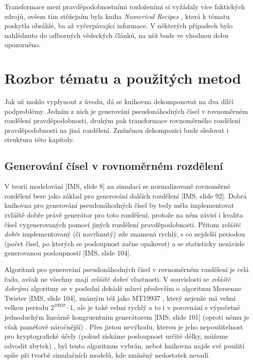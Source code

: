 \documentclass[a4paper,11pt]{article}
\begin{document}
Transformace mezi pravděpodobnostními rozloženími si vyžádaly více faktických zdrojů, ovšem tím stěžejním byla kniha \emph{Numerical Recipes} \cite{NR}, která k tématu poskytla obsáhlé, ba až vyčerpávající informace. V některých případech bylo nahlédnuto do odborných vědeckých článků, na něž bude ve vhodnou dobu upozorněno.


\section{Rozbor tématu a použitých metod}
Jak už mohlo vyplynout z úvodu, dá se knihovna dekomponovat na dva dílčí podproblémy. Jedním z nich je generování pseudonáhodných čísel v rovnoměrném rozdělení pravděpodobnosti, druhým pak transformace rovnoměrného rozdělení pravděpodobnosti na jiná rozdělení. Zmíněnou dekompozici bude sledovat i struktura této kapitoly.

\subsection{Generování čísel v rovnoměrném rozdělení}
V teorii modelování [IMS, slide 8] na simulací se normalizované rovnoměrné rozdělení bere jako základ pro generování dalších rozdělení [IMS, slide 92]. Dobrá knihovna pro generování pseudonáhodných čísel by tedy měla implementovat zvláště dobře právě generátor pro toto rozdělení, protože na něm závisí i kvalita čísel vygenerovaných pomocí jiných rozdělení pravděpodobnosti. Přitom \emph{zvláště dobře} implementovaný (či navrhnutý) zde znamená rychlý, s co nejdelší periodou (počet čísel, po kterých se posloupnost začne opakovat) a se statisticky nezávisle generovanou posloupností [IMS, slide 104].

Algoritmů pro generování pseudonáhodných čísel v rovnoměrném rozdělení je celá řada, avšak ne všechny mají \emph{zvláště dobré} vlastnosti. V souvislosti se \emph{zvláště dobrými} algoritmy se v poslední dekádě mluví především o algoritmu Mersenne Twister [IMS, slide 104], známým též jako MT19937 \cite{Matsumoto}, který nejenže má velmi velkou periodu $2^{19937} – 1$, ale je také velmi rychlý a to i v porovnání s výpočetně jednoduchým lineárně kongruentním generátorem [IMS, slide 101] (oproti němu je však paměťově náročnější) \cite{Matsumoto}. Přes jistou nevýhodu, kterou je jeho nepoužitelnost pro kryptografické účely (pokud získáme posloupnost určité délky, můžeme odvodit zbytek) \cite{Matsumoto}, byl tento algoritmus vybrán, neboť knihovna najde své použití spíše při tvorbě simulačních modelů, kde zmíněný nedostatek nevadí.
\end{document}
